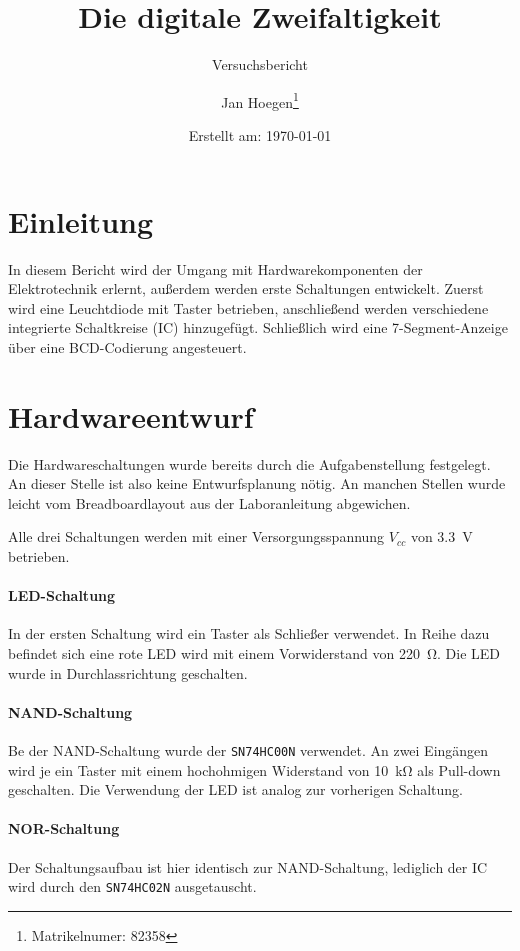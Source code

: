 \documentclass[
    paper=a4,
]{scrartcl}
\title{Die digitale Zweifaltigkeit}
\subtitle{Versuchsbericht}
\author{Jan Hoegen\thanks{Matrikelnumer: 82358}}
\date{Erstellt am: \today}
\begin{document}
\maketitle

\tableofcontents

\newpage

\section{Einleitung}
    In diesem Bericht wird der Umgang mit  Hardwarekomponenten der Elektrotechnik erlernt, außerdem werden erste Schaltungen entwickelt. Zuerst wird eine Leuchtdiode mit Taster betrieben, anschließend werden verschiedene integrierte Schaltkreise (IC) hinzugefügt. Schließlich wird eine 7-Segment-Anzeige über eine BCD-Codierung angesteuert.
    
\section{Hardwareentwurf}
    Die Hardwareschaltungen wurde bereits durch die Aufgabenstellung festgelegt. An dieser Stelle ist also keine Entwurfsplanung nötig. An manchen Stellen wurde leicht vom Breadboardlayout aus der Laboranleitung abgewichen.

    Alle drei Schaltungen werden mit einer Versorgungsspannung \(V_{cc}\) von \SI{3.3}{\volt} betrieben. 

    \paragraph{LED-Schaltung}
        In der ersten Schaltung wird ein Taster als Schließer verwendet. In Reihe dazu befindet sich eine rote LED wird mit einem Vorwiderstand von \SI{220}{\ohm}. Die LED wurde in Durchlassrichtung geschalten.

    \paragraph{NAND-Schaltung}
        Be der NAND-Schaltung wurde der \texttt{SN74HC00N} verwendet. An zwei Eingängen wird je ein Taster mit einem hochohmigen Widerstand von \SI{10}{\kilo\ohm} als Pull-down geschalten. Die Verwendung der LED ist analog zur vorherigen Schaltung.

    \paragraph{NOR-Schaltung}
        Der Schaltungsaufbau ist hier identisch zur NAND-Schaltung, lediglich der IC wird durch den \texttt{SN74HC02N} ausgetauscht.
\end{document}
